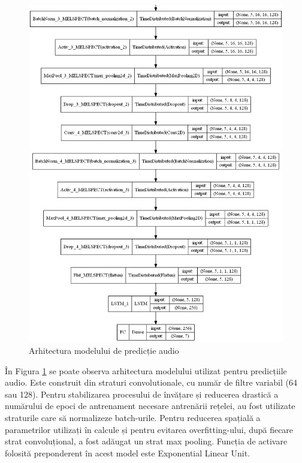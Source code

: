 \documentclass[a4paper, 12pt]{report}
\begin{document}
	\begin{figure}[H]\ContinuedFloat
		\begin{center}
			\includegraphics[width=\textwidth,height=\textheight,keepaspectratio]{images/audio_model_002.jpg}
		\end{center}
		\caption{Arhitectura modelului de predicție audio}
		\label{fig:audio_model}
	\end{figure}
	
 	În Figura \ref{fig:audio_model} se poate observa arhitectura modelului utilizat pentru predicțiile audio. Este construit din straturi convolutionale, cu număr de filtre variabil (64 sau 128). Pentru stabilizarea procesului de învățare și reducerea drastică a numărului de epoci de antrenament necesare antrenării rețelei, au fost utilizate straturile care să normalizeze batch-urile. Pentru reducerea spațială a parametrilor utilizați în calcule și pentru evitarea overfitting-ului, după fiecare strat convoluțional, a fost adăugat un strat max pooling. Funcția de activare folosită preponderent în acest model este Exponential Linear Unit. 
 	
\end{document}
